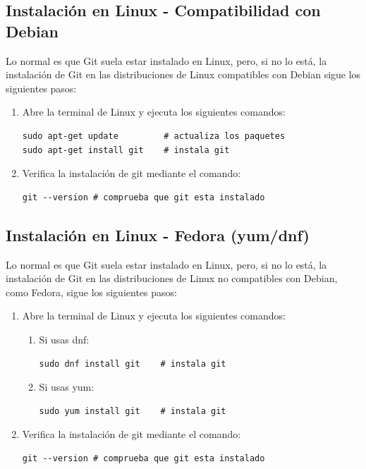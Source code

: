 \documentclass[]{article}
\begin{document}
\subsection{Instalación en Linux - Compatibilidad con Debian}
Lo normal es que Git suela estar instalado en Linux, pero, si no lo está, la instalación de Git en las distribuciones de Linux compatibles con Debian sigue los siguientes pasos:

\begin{enumerate}
    \item Abre la terminal de Linux y ejecuta los siguientes comandos:
    \begin{lstlisting}
sudo apt-get update         # actualiza los paquetes 
sudo apt-get install git    # instala git
    \end{lstlisting}
    \item Verifica la instalación de git mediante el comando:
    \begin{lstlisting}
git --version # comprueba que git esta instalado
    \end{lstlisting}
\end{enumerate}

\subsection{Instalación en Linux - Fedora (yum/dnf)}
Lo normal es que Git suela estar instalado en Linux, pero, si no lo está, la instalación de Git en las distribuciones de Linux no compatibles con Debian, como Fedora, sigue los siguientes pasos:

\begin{enumerate}
    \item Abre la terminal de Linux y ejecuta los siguientes comandos:
    \begin{enumerate}
        \item Si usas dnf:
        \begin{lstlisting}
sudo dnf install git    # instala git
        \end{lstlisting}

        \item Si usas yum:
        \begin{lstlisting}
sudo yum install git    # instala git
        \end{lstlisting}
    \end{enumerate}
    \item Verifica la instalación de git mediante el comando:
    \begin{lstlisting}
git --version # comprueba que git esta instalado
    \end{lstlisting}
\end{enumerate}
\end{document}
